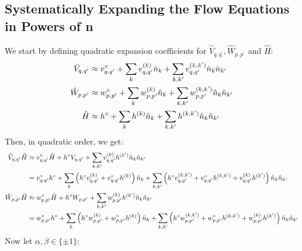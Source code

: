 \begin{appendix}
\subsection{Systematically Expanding the Flow Equations in Powers of n}\label{Systematically Expanding the Flow Equations}
We start by defining quadratic expansion coefficients for $\hat V_{q,q^\prime},  \hat W_{p,p^\prime}$ and $\hat H$:
\begin{subequations}
\begin{align}
\hat V_{q,q^\prime}&\approx  v_{q,q^\prime}^{\circ} + \sum\limits_k v_{q,q^\prime}^{(k)}\hat n_k + \sum\limits_{k,k^\prime} v_{q,q^\prime}^{(k,k^\prime)}\hat n_k\hat n_ {k^\prime}\\
\hat W_{p,p^\prime}&\approx  w_{p,p^\prime}^{\circ} + \sum\limits_k w_{p,p^\prime}^{(k)}\hat n_k + \sum\limits_{k,k^\prime} w_{p,p^\prime}^{(k,k^\prime)}\hat n_k\hat n_ {k^\prime}\\
\hat H&\approx  h^{\circ} + \sum\limits_k h^{(k)}\hat n_k + \sum\limits_{k,k^\prime} h^{(k,k^\prime)}\hat n_k\hat n_ {k^\prime}
\end{align}
\end{subequations}
Then, in quadratic order, we get:
\begin{subequations}
\begin{align}
\hat V_{q,q^\prime} \hat H &\approx v_{q,q^\prime}^{\circ}\hat H+h^{\circ}V_{q,q^\prime}+\sum\limits_{k,k^\prime} v_{q,q^\prime}^{(k)}h^{(k^\prime)}\hat n_k\hat n_{k^\prime}\nonumber\\ 
 & = v_{q,q^\prime}^{\circ}h^{\circ}+\sum\limits_k \left(h^\circ v_{q,q^\prime}^{(k)} + v_{q,q^\prime}^{\circ}h^{(k)}\right)\hat n_k + \sum\limits_{k,k^\prime} \left( h^\circ v_{q,q^\prime}^{(k,k^\prime)}+v_{q,q^\prime}^{\circ} h^{(k,k^\prime)}+v_{q,q^\prime}^{(k)}h^{(k^\prime)}\right)\hat n_k\hat n_{k^\prime}\\
\hat W_{p,p^\prime} \hat H &\approx w_{p,p^\prime}^{\circ}\hat H+h^{\circ}W_{p,p^\prime}+\sum\limits_{k,k^\prime} w_{p,p^\prime}^{(k)}h^{(k^\prime)}\hat n_k\hat n_{k^\prime}\nonumber\\ 
 & = w_{p,p^\prime}^{\circ}h^{\circ}+\sum\limits_k \left(h^\circ w_{p,p^\prime}^{(k)} + w_{p,p^\prime}^{\circ}h^{(k)}\right)\hat n_k + \sum\limits_{k,k^\prime} \left( h^\circ w_{p,p^\prime}^{(k,k^\prime)}+w_{p,p^\prime}^{\circ} h^{(k,k^\prime)}+w_{p,p^\prime}^{(k)}h^{(k^\prime)}\right)\hat n_k\hat n_{k^\prime}
\end{align}
\end{subequations}
Now let $\alpha,\beta\in\{\pm 1\}$:


\end{appendix}
